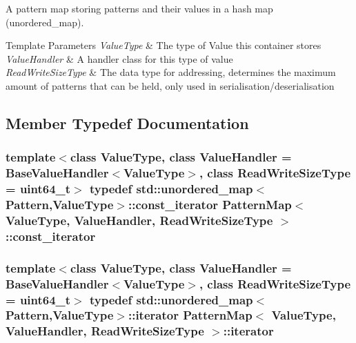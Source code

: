 A pattern map storing patterns and their values in a hash map (unordered\+\_\+map). 


\begin{DoxyTemplParams}{Template Parameters}
{\em Value\+Type} & The type of Value this container stores \\
\hline
{\em Value\+Handler} & A handler class for this type of value \\
\hline
{\em Read\+Write\+Size\+Type} & The data type for addressing, determines the maximum amount of patterns that can be held, only used in serialisation/deserialisation \\
\hline
\end{DoxyTemplParams}


\subsection{Member Typedef Documentation}
\hypertarget{classPatternMap_aba8ff62eadadedc25bf4ea799a322cf3}{}
\subsubsection[{const\+\_\+iterator}]{\setlength{\rightskip}{0pt plus 5cm}template$<$class Value\+Type, class Value\+Handler = Base\+Value\+Handler$<$\+Value\+Type$>$, class Read\+Write\+Size\+Type = uint64\+\_\+t$>$ typedef std\+::unordered\+\_\+map$<${\bf Pattern},Value\+Type$>$\+::{\bf const\+\_\+iterator} {\bf Pattern\+Map}$<$ Value\+Type, Value\+Handler, Read\+Write\+Size\+Type $>$\+::{\bf const\+\_\+iterator}}\label{classPatternMap_aba8ff62eadadedc25bf4ea799a322cf3}
\hypertarget{classPatternMap_a4de5ceaff3526d091098b4d82dde2b27}{}
\subsubsection[{iterator}]{\setlength{\rightskip}{0pt plus 5cm}template$<$class Value\+Type, class Value\+Handler = Base\+Value\+Handler$<$\+Value\+Type$>$, class Read\+Write\+Size\+Type = uint64\+\_\+t$>$ typedef std\+::unordered\+\_\+map$<${\bf Pattern},Value\+Type$>$\+::{\bf iterator} {\bf Pattern\+Map}$<$ Value\+Type, Value\+Handler, Read\+Write\+Size\+Type $>$\+::{\bf iterator}}\label{classPatternMap_a4de5ceaff3526d091098b4d82dde2b27}



